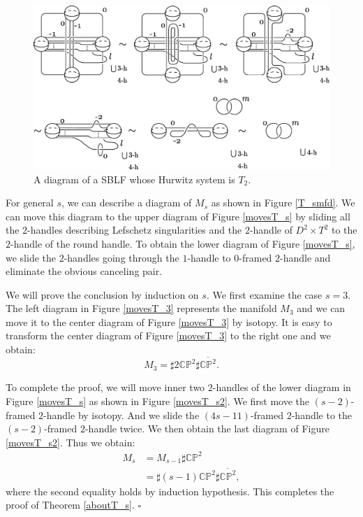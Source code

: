 \documentclass{amsart}
\theoremstyle{plain}
\theoremstyle{definition}
\begin{document}
\begin{figure}[htbp]
\begin{center}
\includegraphics[width=140mm]{T_2mfd.eps}
\end{center}
\caption{A diagram of a SBLF whose Hurwitz system is $T_2$. }
\label{T_2mfd}
\end{figure}

For general $s$, we can describe a diagram of $M_s$ as shown in Figure \ref{T_smfd}. 
We can move this diagram to the upper diagram of Figure \ref{movesT_s} by sliding all the $2$-handles describing Lefschetz singularities and the $2$-handle of $D^2\times T^2$ to the $2$-handle of the round handle. 
To obtain the lower diagram of Figure \ref{movesT_s}, we slide the $2$-handles going through the $1$-handle to $0$-framed $2$-handle and eliminate the obvious canceling pair. 

\par

We will prove the conclusion by induction on $s$. 
We first examine the case $s=3$. 
The left diagram in Figure \ref{movesT_3} represents the manifold $M_3$ and we can move it to the center diagram of Figure \ref{movesT_3} by isotopy. 
It is easy to transform the center diagram of Figure \ref{movesT_3} to the right one and we obtain: 
\[
M_3=\sharp 2\mathbb{CP}^2\sharp\overline{\mathbb{CP}^2}. 
\]

To complete the proof, we will move inner two $2$-handles of the lower diagram in Figure \ref{movesT_s} as shown in Figure \ref{movesT_s2}. 
We first move the $(s-2)$-framed $2$-handle by isotopy. 
And we slide the $(4s-11)$-framed $2$-handle to the $(s-2)$-framed $2$-handle twice. 
We then obtain the last diagram of Figure \ref{movesT_s2}. 
Thus we obtain: 
{\allowdisplaybreaks
\begin{align*}
M_s & =M_{s-1}\sharp\mathbb{CP}^2 \\
& =\sharp (s-1)\mathbb{CP}^2\sharp\overline{\mathbb{CP}^2}, 
\end{align*}
}
where the second equality holds by induction hypothesis. 
This completes the proof of Theorem \ref{aboutT_s}.  \hfill $\square$
\end{document}
